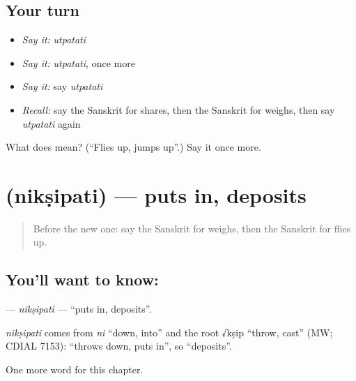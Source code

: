 \subsection*{Your turn}
\begin{itemize}
\raggedright
  \item \emph{Say it:} \emph{utpatati}
  \item \emph{Say it:} \emph{utpatati}, once more
  \item \emph{Say it:} say \emph{utpatati}
  \item \emph{Recall:} say the Sanskrit for shares, then the Sanskrit for weighs, then say \emph{utpatati} again
\end{itemize}

\begin{tcolorbox}[breakable,colback=teal!4,colframe=teal!35!black,title={Before you move on}]
What does  mean? (\textquotedblleft{}Flies up, jumps up\textquotedblright{}.) Say it once more.
\end{tcolorbox}
\section[\texorpdfstring{\sk{निक्षिपति} (nikṣipati)}{निक्षिपति (nikṣipati)}]{ (nikṣipati) — puts in, deposits}

\label{lesson:SA-C144-niksipati}



\begin{quote}
Before the new one: say the Sanskrit for weighs, then the Sanskrit for flies up.
\end{quote}

\subsection*{You'll want to know: }
\textbf{} — \emph{nikṣipati} — \textquotedblleft{}puts in, deposits\textquotedblright{}.

\begin{cousinweb}
\emph{nikṣipati} comes from \emph{ni} \textquotedblleft{}down, into\textquotedblright{} and the root √kṣip \textquotedblleft{}throw, cast\textquotedblright{} (MW; CDIAL 7153): \textquotedblleft{}throws down, puts in\textquotedblright{}, so \textquotedblleft{}deposits\textquotedblright{}.
\end{cousinweb}

\begin{grammarlens}[title={What you've built}]
One more word for this chapter.
\end{grammarlens}

